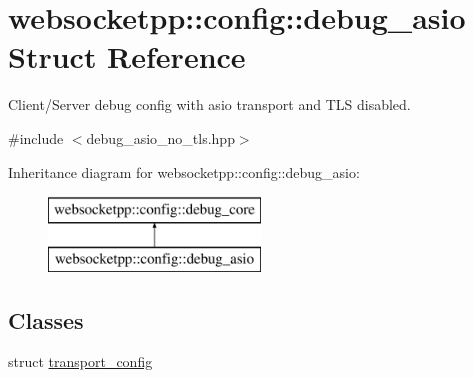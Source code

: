 \hypertarget{structwebsocketpp_1_1config_1_1debug__asio}{}\section{websocketpp\+:\+:config\+:\+:debug\+\_\+asio Struct Reference}
\label{structwebsocketpp_1_1config_1_1debug__asio}


Client/\+Server debug config with asio transport and T\+L\+S disabled.  




{\ttfamily \#include $<$debug\+\_\+asio\+\_\+no\+\_\+tls.\+hpp$>$}

Inheritance diagram for websocketpp\+:\+:config\+:\+:debug\+\_\+asio\+:\begin{figure}[H]
\begin{center}
\leavevmode
\includegraphics[height=2.000000cm]{structwebsocketpp_1_1config_1_1debug__asio}
\end{center}
\end{figure}
\subsection*{Classes}
\begin{DoxyCompactItemize}
\item 
struct \hyperlink{structwebsocketpp_1_1config_1_1debug__asio_1_1transport__config}{transport\+\_\+config}
\end{DoxyCompactItemize}
